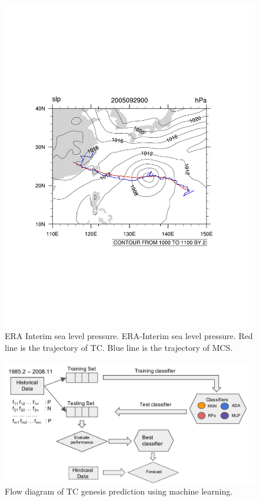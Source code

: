 \documentclass{article}
\begin{document}
\begin{figure}[h] %
\centering
\includegraphics[width=30pc]{figs/obs_validation.pdf}
\caption{ERA Interim sea level pressure. ERA-Interim sea level pressure. Red line is the trajectory of TC. 
Blue line is the trajectory of MCS.}
\label{figone}
\end{figure}

\begin{figure}[h] %
\centering
\includegraphics[width=30pc]{figs/workflow.pdf}
\caption{Flow diagram of TC genesis prediction using machine learning.}
\label{figone}
\end{figure}
\end{document}
